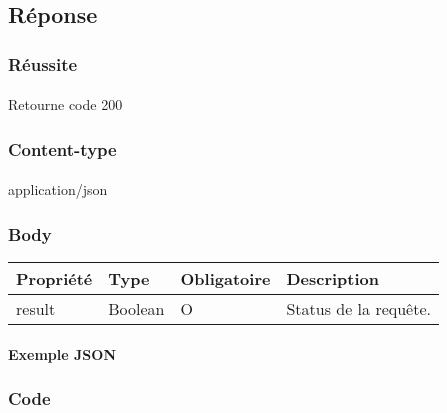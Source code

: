 \newpage
\subsection{Réponse}
	\subsubsection{Réussite}
		\paragraph{}
			Retourne code 200
			
	\subsubsection{Content-type}
		\paragraph{}
			application/json
	
	\subsubsection{Body}
		\begin{center}
			\begin{tabularx}{\textwidth}{| T{0.2122\textwidth} | S{0.22\textwidth} | S{0.15\textwidth} | S{0.3\textwidth} |}
				\hline
				Propriété & Type & Obligatoire & Description \\
				\hline
				result & Boolean & O & Status de la requête. \\
				\hline
			\end{tabularx}
		\end{center}
		
		\paragraph{Exemple JSON}
			\paragraph{}
			
			
			
	\subsubsection{Code}
		\paragraph{}
